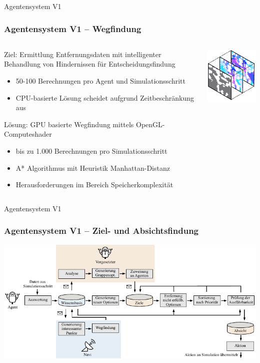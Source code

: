 \documentclass[aspectratio=169]{beamer} %
\begin{document}
\begin{frame}{Agentensystem V1}
\frametitle{Agentensystem V1 -- Wegfindung}
\begin{columns}
\begin{column}{0.7\textwidth}
\begin{block}{Ziel: Ermittlung Entfernungsdaten mit intelligenter Behandlung von Hindernissen für Entscheidungsfindung}
\end{block}
	\begin{itemize}
		\item{50-100 Berechnungen pro Agent und Simulationsschritt}
		\item{CPU-basierte Lösung scheidet aufgrund Zeitbeschränkung aus}
	\end{itemize}
\begin{exampleblock}{Lösung: GPU basierte Wegfindung mittels OpenGL-Computeshader}
\end{exampleblock}
	\begin{itemize}
		\item{bis zu 1.000 Berechnungen pro Simulationsschritt}
		\item{A* Algorithmus mit Heuristik Manhattan-Distanz}
		\item{Herausforderungen im Bereich Speicherkomplexität}
	\end{itemize}
\end{column}
\begin{column}{0.3\textwidth}
    \begin{center}
     \includegraphics[scale=1.3]{./figures/Pathfinding.pdf}    
     \end{center}
\end{column}
\end{columns}
\end{frame}

\begin{frame}{Agentensystem V1}
\frametitle{Agentensystem V1 -- Ziel- und Absichtsfindung}
\begin{center}
\includegraphics[scale=1.05]{./figures/Entscheidungsfindung2.pdf} 
\end{center}
\end{frame}
\end{document}
